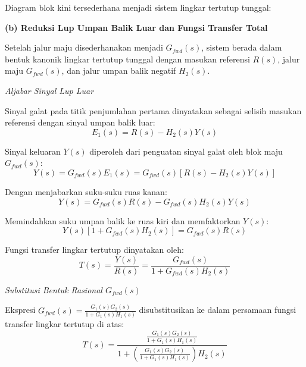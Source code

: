 \documentclass[11pt,a4paper]{article}
\begin{document}
Diagram blok kini tersederhana menjadi sistem lingkar tertutup tunggal:

\begin{center}
\end{center}

\textbf{(b) Reduksi Lup Umpan Balik Luar dan Fungsi Transfer Total}

Setelah jalur maju disederhanakan menjadi $G_{fwd}(s)$, sistem berada dalam bentuk kanonik lingkar tertutup tunggal dengan masukan referensi $R(s)$, jalur maju $G_{fwd}(s)$, dan jalur umpan balik negatif $H_2(s)$.

\textit{Aljabar Sinyal Lup Luar}

Sinyal galat pada titik penjumlahan pertama dinyatakan sebagai selisih masukan referensi dengan sinyal umpan balik luar:
$$E_1(s) = R(s) - H_2(s) Y(s)$$

Sinyal keluaran $Y(s)$ diperoleh dari penguatan sinyal galat oleh blok maju $G_{fwd}(s)$:
$$Y(s) = G_{fwd}(s) E_1(s) = G_{fwd}(s) \left[ R(s) - H_2(s) Y(s) \right]$$

Dengan menjabarkan suku-suku ruas kanan:
$$Y(s) = G_{fwd}(s) R(s) - G_{fwd}(s) H_2(s) Y(s)$$

Memindahkan suku umpan balik ke ruas kiri dan memfaktorkan $Y(s)$:
$$Y(s) \left[ 1 + G_{fwd}(s) H_2(s) \right] = G_{fwd}(s) R(s)$$

Fungsi transfer lingkar tertutup dinyatakan oleh:
$$T(s) = \frac{Y(s)}{R(s)} = \frac{G_{fwd}(s)}{1 + G_{fwd}(s) H_2(s)}$$

\textit{Substitusi Bentuk Rasional $G_{fwd}(s)$}

Ekspresi $G_{fwd}(s) = \frac{G_1(s) G_2(s)}{1 + G_1(s) H_1(s)}$ disubstitusikan ke dalam persamaan fungsi transfer lingkar tertutup di atas:
$$T(s) = \frac{\frac{G_1(s) G_2(s)}{1 + G_1(s) H_1(s)}}{1 + \left( \frac{G_1(s) G_2(s)}{1 + G_1(s) H_1(s)} \right) H_2(s)}$$
\end{document}
